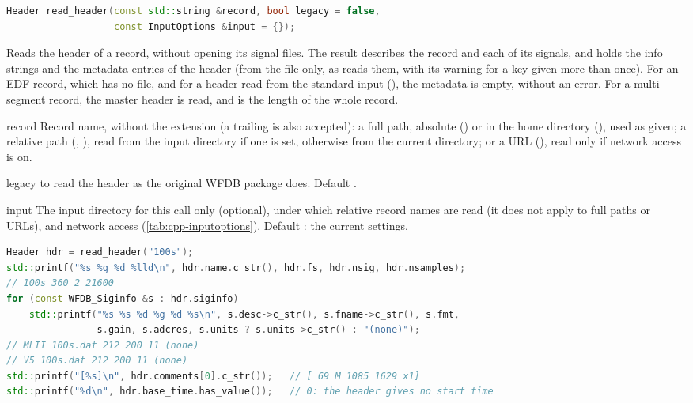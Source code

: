 \begin{lstlisting}[language=C++,style=signature]
Header read_header(const std::string &record, bool legacy = false,
                   const InputOptions &input = {});
\end{lstlisting}
Reads the header of a record, without opening its signal files. The result describes the
record and each of its signals, and holds the info strings and the metadata entries of the
header (from the  file only, as  reads them, with its
warning for a key given more than once). For an EDF record, which has no 
file, and for a header read from the standard input (), the metadata is empty,
without an error. For a multi-segment record, the master header is read, and
 is the length of the whole record.
\begin{params}
\item[record] Record name, without the  extension (a trailing  is
  also accepted): a full path, absolute () or in the home
  directory (), used as given; a relative path
  (, ), read from the input directory if one is set,
  otherwise from the current directory; or a URL
  (), read only if network access is
  on.
\item[legacy]  to read the header as the original WFDB package does. Default
  .
\item[input] The input directory for this call only (optional), under which relative
  record names are read (it does not apply to full paths or URLs), and network access
  (\cref{tab:cpp-inputoptions}). Default \code{\{\}}: the current settings.
\end{params}
\begin{lstlisting}[language=C++,style=example]
Header hdr = read_header("100s");
std::printf("%s %g %d %lld\n", hdr.name.c_str(), hdr.fs, hdr.nsig, hdr.nsamples);
// 100s 360 2 21600
for (const WFDB_Siginfo &s : hdr.siginfo)
    std::printf("%s %s %d %g %d %s\n", s.desc->c_str(), s.fname->c_str(), s.fmt,
                s.gain, s.adcres, s.units ? s.units->c_str() : "(none)");
// MLII 100s.dat 212 200 11 (none)
// V5 100s.dat 212 200 11 (none)
std::printf("[%s]\n", hdr.comments[0].c_str());   // [ 69 M 1085 1629 x1]
std::printf("%d\n", hdr.base_time.has_value());   // 0: the header gives no start time
\end{lstlisting}

